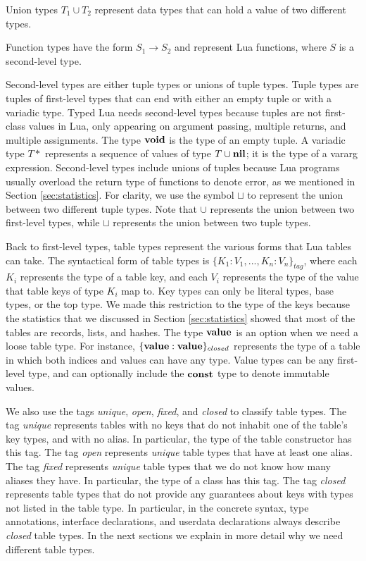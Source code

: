 Union types $T_{1} \cup T_{2}$ represent data types that can hold a value
of two different types.

Function types have the form $S_{1} \rightarrow S_{2}$ and represent Lua functions,
where $S$ is a second-level type.

Second-level types are either tuple types or unions of tuple types.
Tuple types are tuples of first-level types that can end with
either an empty tuple or with a variadic type.
Typed Lua needs second-level types because tuples are not first-class
values in Lua, only appearing on argument passing, multiple returns,
and multiple assignments.
The type $\mathbf{void}$ is the type of an empty tuple.
A variadic type $T{*}$ represents a sequence of values of type $T \cup \mathbf{nil}$;
it is the type of a vararg expression.
Second-level types include unions of tuples because Lua programs
usually overload the return type of functions to denote error,
as we mentioned in Section \ref{sec:statistics}.
For clarity, we use the symbol $\sqcup$ to represent the union between
two different tuple types.
Note that $\cup$ represents the union between two first-level types,
while $\sqcup$ represents the union between two tuple types.

Back to first-level types, table types represent the various forms
that Lua tables can take.
The syntactical form of table types is $\{ K_{1}{:}V_{1}, ..., K_{n}{:}V_{n} \}_{tag}$,
where each $K_{i}$ represents the type of a table key,
and each $V_{i}$ represents the type of the value that table keys of type $K_{i}$ map to.
Key types can only be literal types, base types, or the top type.
We made this restriction to the type of the keys because the statistics
that we discussed in Section \ref{sec:statistics} showed that most
of the tables are records, lists, and hashes.
The type $\mathbf{value}$ is an option when we need a loose table type.
For instance, $\{\mathbf{value}:\mathbf{value}\}_{closed}$ represents the type of a
table in which both indices and values can have any type.
Value types can be any first-level type, and can optionally include
the $\mathbf{const}$ type to denote immutable values.

We also use the tags \emph{unique}, \emph{open}, \emph{fixed}, and \emph{closed}
to classify table types.
The tag \emph{unique} represents tables with no keys that do not
inhabit one of the table's key types, and with no alias.
In particular, the type of the table constructor has this tag.
The tag \emph{open} represents \emph{unique} table types that
have at least one alias.
The tag \emph{fixed} represents \emph{unique} table types that we
do not know how many aliases they have.
In particular, the type of a class has this tag.
The tag \emph{closed} represents table types that do not provide
any guarantees about keys with types not listed in the table type.
In particular, in the concrete syntax, type annotations, interface
declarations, and userdata declarations always describe \emph{closed} table types.
In the next sections we explain in more detail why we need
different table types.

